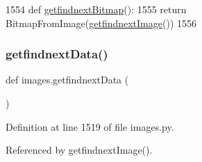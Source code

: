 \begin{DoxyCode}
1554 \textcolor{keyword}{def }\hyperlink{namespaceimages_a3fda326344336dedf2589b44ed009507}{getfindnextBitmap}():
1555     \textcolor{keywordflow}{return} BitmapFromImage(\hyperlink{namespaceimages_a1999c628386d92b6a1b50f61cfe4e534}{getfindnextImage}())
1556 
\end{DoxyCode}
\mbox{\label{namespaceimages_abb3065c822065fe636d42835fa80b3b5}} 
\subsubsection{\texorpdfstring{getfindnext\+Data()}{getfindnextData()}}
{\footnotesize\ttfamily def images.\+getfindnext\+Data (\begin{DoxyParamCaption}{ }\end{DoxyParamCaption})}



Definition at line 1519 of file images.\+py.



Referenced by getfindnext\+Image().


